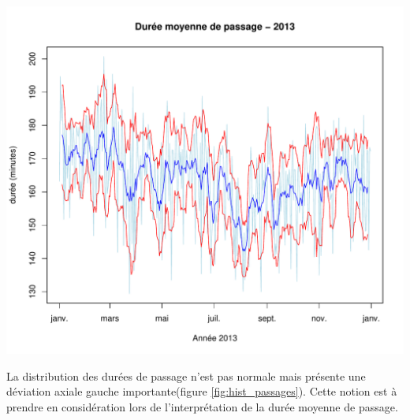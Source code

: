 \documentclass[12pt,english,french,twoside]{book}\usepackage[]{graphicx}\usepackage[]{color}
\makeatletter
\def\maxwidth{ %
  \ifdim\Gin@nat@width>\linewidth
    \linewidth
  \else
    \Gin@nat@width
  \fi
}
\newenvironment{knitrout}{}{} %
\makeatother
\begin{document}
\begin{center}
\begin{knitrout}
\color{fgcolor}
\includegraphics[width=\maxwidth]{figure/graphe_duree_moyenne_passage} 

\end{knitrout}

\end{center}





La distribution des durées de passage n'est pas normale mais présente une déviation axiale gauche importante(figure \ref{fig:hist_passages}). Cette notion est à prendre en considération lors de l'interprétation de la durée moyenne de passage.
\end{document}
